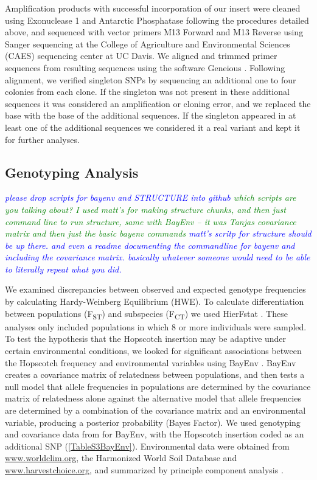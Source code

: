 \documentclass[12pt]{article}
\newcommand{\jri}[1]{\textcolor{blue}{ \emph{\scriptsize  #1}} }
\newcommand{\lev}[1]{\textcolor{green}{\emph{\scriptsize #1}} }
\begin{document}
Amplification products with successful incorporation of our insert were cleaned using Exonuclease 1 and Antarctic Phosphatase following the procedures detailed above, and sequenced with vector primers M13 Forward and M13 Reverse using Sanger sequencing at the College of Agriculture and Environmental Sciences (CAES) sequencing center at UC Davis. We aligned and trimmed primer sequences from resulting sequences using the software Geneious \citep{Kearse2012}. Following alignment, we verified singleton SNPs by sequencing an additional one to four colonies from each clone. If the singleton was not present in these additional sequences it was considered an amplification or cloning error, and we replaced the base with the base of the additional sequences. If the singleton appeared in at least one of the additional sequences we considered it a real variant and kept it for further analyses. 

\subsection*{Genotyping Analysis} \jri{please drop scripts for bayenv and STRUCTURE into github} \lev{which scripts are you talking about? I used matt's for making structure chunks, and then just command line to run structure, same with BayEnv -- it was Tanjas covariance matrix and then just the basic bayenv commands} \jri{matt's scritp for structure should be up there. and even a readme documenting the commandline for bayenv and including the covariance matrix. basically whatever someone would need to be able to literally repeat what you did.}

We examined discrepancies between observed and expected genotype frequencies by calculating Hardy-Weinberg Equilibrium (HWE).  To calculate differentiation between populations (F\textsubscript{ST}) and subspecies (F\textsubscript{CT}) we used HierFstat \citep{Goudet2005}. These analyses only included populations in which 8 or more individuals were sampled. To test the hypothesis that the Hopscotch insertion may be adaptive under certain environmental conditions, we looked for significant associations between the Hopscotch frequency and environmental variables using BayEnv \citep{Coop2010}. BayEnv creates a covariance matrix of relatedness between populations, and then tests a null model that allele frequencies in populations are determined by the covariance matrix of relatedness alone against the alternative model that allele frequencies are determined by a combination of the covariance matrix and an environmental variable, producing a posterior probability (Bayes Factor)\citep{Coop2010}. We used genotyping and covariance data from \citet{Pyhajarvi2013} for BayEnv, with the Hopscotch insertion coded as an additional SNP (\ref{TableS3BayEnv}). Environmental data were obtained from \url{www.worldclim.org}, the Harmonized World Soil Database and \url{www.harvestchoice.org}, and summarized by principle component analysis \citep{Pyhajarvi2013}.
\end{document}
